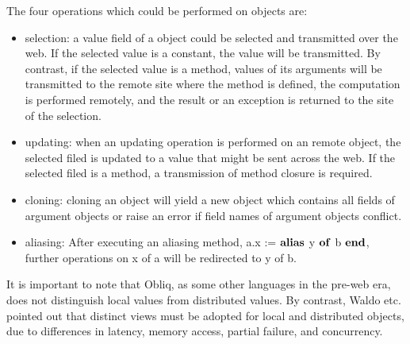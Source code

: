 The four operations which could be performed on objects are:
\begin{itemize}
  \item selection: a value field of a object could be selected and transmitted over the web.  If the selected value is a constant, the value will be transmitted.  By contrast, if the selected value is a method, values of its arguments will be transmitted to the remote site where the method is defined, the computation is performed remotely, and the result or an exception is returned to the site of the selection.
  \item updating: when an updating operation is performed on an remote object, the selected filed is updated to a value that might be sent across the web.  If the selected filed is a method, a transmission of method closure is required.
  \item cloning: cloning an object will yield a new object which contains all fields of argument objects or raise an error if field names of argument objects conflict.
  \item aliasing:  After executing an aliasing method, a.x := $\bf{alias}$ y $\bf{of}$ b $\bf{end}$, further operations on x of a will be redirected to y of b.
\end{itemize}

It is important to note that Obliq, as some other languages in the pre-web era, does not distinguish local values from distributed values.  By contrast, Waldo etc. \cite{dis_note} pointed out that distinct views must be adopted for local and distributed objects, due to differences in latency, memory access, partial failure, and concurrency.